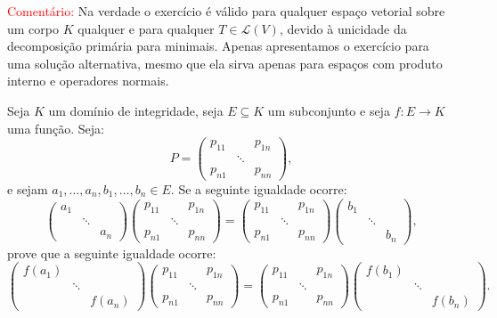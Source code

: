 \documentclass[11pt,a4paper]{article}
\begin{document}
\bigskip
\noindent
\textcolor{red}{Comentário:} Na verdade o exercício é válido para qualquer espaço vetorial sobre um corpo $K$ qualquer e para qualquer $T\in\mathcal{L}(V)$, devido à unicidade da decomposição primária para minimais. Apenas apresentamos o exercício para uma solução alternativa, mesmo que ela sirva apenas para espaços com produto interno e operadores normais.

\begin{exercicio}\label{blah2}
Seja $K$ um domínio de integridade, seja $E\subseteq K$ um subconjunto e seja $f:E\rightarrow K$ uma função. Seja:
\[
P=\begin{pmatrix}
p_{11}&&p_{1n}\\&\ddots&\\p_{n1}&&p_{nn}
\end{pmatrix},
\]
e sejam $a_1,\dots,a_n,b_1,\dots,b_n\in E$. Se a seguinte igualdade ocorre:
\[
\begin{pmatrix}
a_1&&\\&\ddots&\\&&a_n
\end{pmatrix}
\begin{pmatrix}
p_{11}&&p_{1n}\\&\ddots&\\p_{n1}&&p_{nn}
\end{pmatrix}=
\begin{pmatrix}
p_{11}&&p_{1n}\\&\ddots&\\p_{n1}&&p_{nn}
\end{pmatrix}
\begin{pmatrix}
b_1&&\\&\ddots&\\&&b_n
\end{pmatrix},
\]
prove que a seguinte igualdade ocorre:
\[
\begin{pmatrix}
f(a_1)&&\\&\ddots&\\&&f(a_n)
\end{pmatrix}
\begin{pmatrix}
p_{11}&&p_{1n}\\&\ddots&\\p_{n1}&&p_{nn}
\end{pmatrix}=
\begin{pmatrix}
p_{11}&&p_{1n}\\&\ddots&\\p_{n1}&&p_{nn}
\end{pmatrix}
\begin{pmatrix}
f(b_1)&&\\&\ddots&\\&&f(b_n)
\end{pmatrix}.
\]
\end{exercicio}
\end{document}
